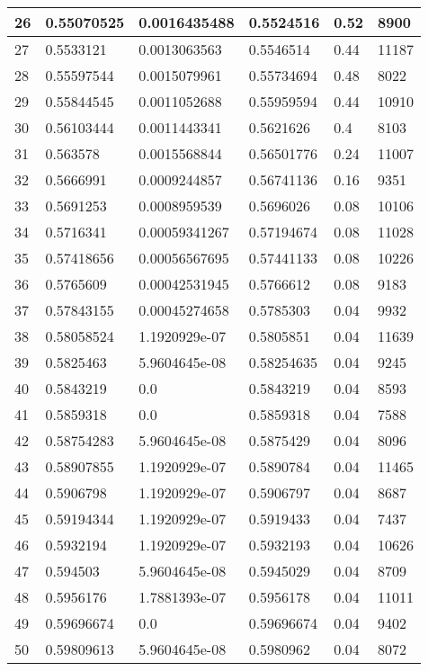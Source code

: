 \begin{longtable}{|l|l|l|l|l|l|}
26 & 0.55070525 & 0.0016435488 & 0.5524516 & 0.52 & 8900 \\ \hline 
27 & 0.5533121 & 0.0013063563 & 0.5546514 & 0.44 & 11187 \\ \hline 
28 & 0.55597544 & 0.0015079961 & 0.55734694 & 0.48 & 8022 \\ \hline 
29 & 0.55844545 & 0.0011052688 & 0.55959594 & 0.44 & 10910 \\ \hline 
30 & 0.56103444 & 0.0011443341 & 0.5621626 & 0.4 & 8103 \\ \hline 
31 & 0.563578 & 0.0015568844 & 0.56501776 & 0.24 & 11007 \\ \hline 
32 & 0.5666991 & 0.0009244857 & 0.56741136 & 0.16 & 9351 \\ \hline 
33 & 0.5691253 & 0.0008959539 & 0.5696026 & 0.08 & 10106 \\ \hline 
34 & 0.5716341 & 0.00059341267 & 0.57194674 & 0.08 & 11028 \\ \hline 
35 & 0.57418656 & 0.00056567695 & 0.57441133 & 0.08 & 10226 \\ \hline 
36 & 0.5765609 & 0.00042531945 & 0.5766612 & 0.08 & 9183 \\ \hline 
37 & 0.57843155 & 0.00045274658 & 0.5785303 & 0.04 & 9932 \\ \hline 
38 & 0.58058524 & 1.1920929e-07 & 0.5805851 & 0.04 & 11639 \\ \hline 
39 & 0.5825463 & 5.9604645e-08 & 0.58254635 & 0.04 & 9245 \\ \hline 
40 & 0.5843219 & 0.0 & 0.5843219 & 0.04 & 8593 \\ \hline 
41 & 0.5859318 & 0.0 & 0.5859318 & 0.04 & 7588 \\ \hline 
42 & 0.58754283 & 5.9604645e-08 & 0.5875429 & 0.04 & 8096 \\ \hline 
43 & 0.58907855 & 1.1920929e-07 & 0.5890784 & 0.04 & 11465 \\ \hline 
44 & 0.5906798 & 1.1920929e-07 & 0.5906797 & 0.04 & 8687 \\ \hline 
45 & 0.59194344 & 1.1920929e-07 & 0.5919433 & 0.04 & 7437 \\ \hline 
46 & 0.5932194 & 1.1920929e-07 & 0.5932193 & 0.04 & 10626 \\ \hline 
47 & 0.594503 & 5.9604645e-08 & 0.5945029 & 0.04 & 8709 \\ \hline 
48 & 0.5956176 & 1.7881393e-07 & 0.5956178 & 0.04 & 11011 \\ \hline 
49 & 0.59696674 & 0.0 & 0.59696674 & 0.04 & 9402 \\ \hline 
50 & 0.59809613 & 5.9604645e-08 & 0.5980962 & 0.04 & 8072 \\ \hline 

\end{longtable}
